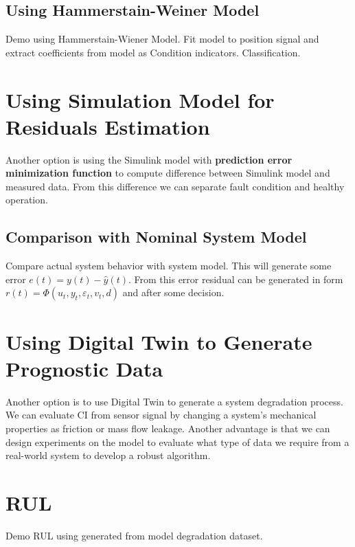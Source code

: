 \subsection{Using Hammerstain-Weiner Model}
Demo using Hammerstain-Wiener Model. Fit model to position signal and
extract coefficients from model as Condition indicators. Classification.

\section{Using Simulation Model for Residuals
Estimation}\label{sec:residuals}

Another option is using the Simulink model with \textbf{prediction
error minimization function} to compute difference between Simulink model
and measured data. From this difference we can separate fault condition and
healthy operation. 


\subsection{Comparison with Nominal System Model}

Compare actual system behavior with system model. This will generate some
error $e(t) = y(t) - \hat{y}(t)$. From this error residual can be generated
in form $r(t)=\Phi(u_t,y_t, \varepsilon_t,v_t,d)$ and after some decision.

\section{Using Digital Twin to Generate Prognostic Data}
Another option is to use Digital Twin to generate a system degradation
process. We can evaluate CI from sensor signal by changing a system's
mechanical properties as friction or mass flow leakage.  Another advantage
is that we can design experiments on the model to evaluate what type of
data we require from a real-world system to develop a robust algorithm.

\section{RUL}
Demo RUL using generated from model degradation dataset.





